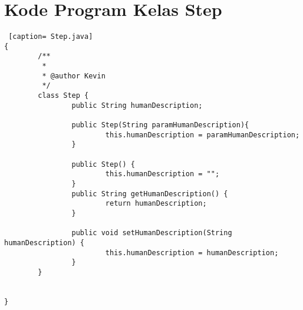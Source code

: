 \chapter{Kode Program Kelas Step}
\label{Kode Program Kelas Step}

\begin{lstlisting} [caption= Step.java]
{ 
		/**
		 *
		 * @author Kevin
		 */
		class Step {
				public String humanDescription;

				public Step(String paramHumanDescription){
						this.humanDescription = paramHumanDescription;
				}

				public Step() {
						this.humanDescription = "";
				}
				public String getHumanDescription() {
						return humanDescription;
				}

				public void setHumanDescription(String humanDescription) {
						this.humanDescription = humanDescription;
				}
		}

		
}
\end{lstlisting}